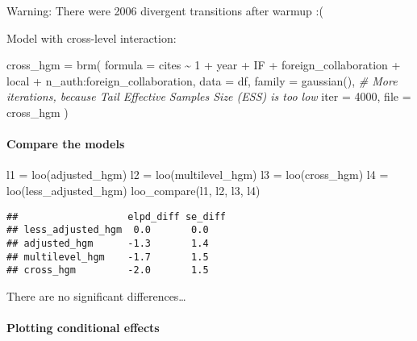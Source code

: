 \documentclass[
]{article}
\newenvironment{Shaded}{\begin{snugshade}}{\end{snugshade}}
\newcommand{\AttributeTok}[1]{\textcolor[rgb]{0.77,0.63,0.00}{#1}}
\newcommand{\CommentTok}[1]{\textcolor[rgb]{0.56,0.35,0.01}{\textit{#1}}}
\newcommand{\DecValTok}[1]{\textcolor[rgb]{0.00,0.00,0.81}{#1}}
\newcommand{\FunctionTok}[1]{\textcolor[rgb]{0.00,0.00,0.00}{#1}}
\newcommand{\NormalTok}[1]{#1}
\newcommand{\OtherTok}[1]{\textcolor[rgb]{0.56,0.35,0.01}{#1}}
\newcommand{\SpecialCharTok}[1]{\textcolor[rgb]{0.00,0.00,0.00}{#1}}
\newcommand{\StringTok}[1]{\textcolor[rgb]{0.31,0.60,0.02}{#1}}
\begin{document}
Warning: There were 2006 divergent transitions after warmup :(

Model with cross-level interaction:

\begin{Shaded}
\begin{Highlighting}[]
\NormalTok{cross\_hgm }\OtherTok{=} \FunctionTok{brm}\NormalTok{(}
  \AttributeTok{formula =}\NormalTok{ cites }\SpecialCharTok{\textasciitilde{}} \DecValTok{1} \SpecialCharTok{+}\NormalTok{ year }\SpecialCharTok{+}\NormalTok{ IF }\SpecialCharTok{+}\NormalTok{ foreign\_collaboration }\SpecialCharTok{+}\NormalTok{ local }\SpecialCharTok{+}\NormalTok{ n\_auth}\SpecialCharTok{:}\NormalTok{foreign\_collaboration,}
  \AttributeTok{data =}\NormalTok{ df,}
  \AttributeTok{family =} \FunctionTok{gaussian}\NormalTok{(),}
  \CommentTok{\# More iterations, because Tail Effective Samples Size (ESS) is too low}
  \AttributeTok{iter =} \DecValTok{4000}\NormalTok{,}
  \AttributeTok{file =} \StringTok{\textquotesingle{}cross\_hgm\textquotesingle{}}
\NormalTok{)}
\end{Highlighting}
\end{Shaded}

\hypertarget{compare-the-models}{%
\paragraph{Compare the models}\label{compare-the-models}}

\begin{Shaded}
\begin{Highlighting}[]
\NormalTok{l1 }\OtherTok{=} \FunctionTok{loo}\NormalTok{(adjusted\_hgm)}
\NormalTok{l2 }\OtherTok{=} \FunctionTok{loo}\NormalTok{(multilevel\_hgm)}
\NormalTok{l3 }\OtherTok{=} \FunctionTok{loo}\NormalTok{(cross\_hgm)}
\NormalTok{l4 }\OtherTok{=} \FunctionTok{loo}\NormalTok{(less\_adjusted\_hgm)}
\FunctionTok{loo\_compare}\NormalTok{(l1, l2, l3, l4)}
\end{Highlighting}
\end{Shaded}

\begin{verbatim}
##                   elpd_diff se_diff
## less_adjusted_hgm  0.0       0.0   
## adjusted_hgm      -1.3       1.4   
## multilevel_hgm    -1.7       1.5   
## cross_hgm         -2.0       1.5
\end{verbatim}

There are no significant differences\ldots{}

\hypertarget{plotting-conditional-effects-1}{%
\paragraph{Plotting conditional
effects}\label{plotting-conditional-effects-1}}
\end{document}
